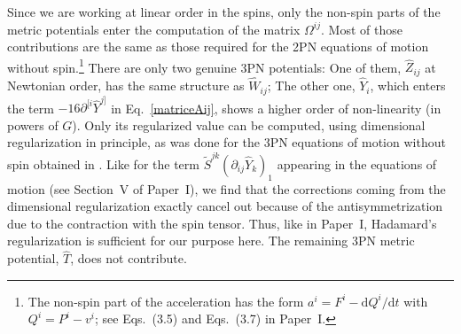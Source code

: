 \documentclass[
superscriptaddress,
preprint,
prd,tightenlines,showpacs,nofootinbib,
eqsecnum,
amsfonts,amsmath,amssymb]{revtex4-1}
\newcommand{\ud}{\mathrm{d}}
\begin{document}
Since we are working at linear order in the spins, only the non-spin
parts of the metric potentials enter the computation of the matrix
$\Omega^{ij}$. Most of those contributions are the same as those
required for the 2PN equations of motion without spin.\footnote{The
  non-spin part of the acceleration has the form $a^{i} = F^{i} - \ud
  Q^{i}/\ud t $ with $Q^i = P^i - v^i$; see Eqs.~(3.5) and Eqs.~(3.7)
  in Paper~I.} There are only two genuine 3PN potentials: One of them,
$\hat{Z}_{ij}$ at Newtonian order, has the same structure as
$\hat{W}_{ij}$; The other one, $\hat{Y}_i$, which enters the term
$-16 \partial^{[i}\hat{Y}^{j]}$ in Eq.~\eqref{matriceAij}, shows a
higher order of non-linearity (in powers of $G$). Only its regularized
value can be computed, using dimensional regularization in principle,
as was done for the 3PN equations of motion without spin obtained in
\cite{Blanchet2004}. Like for the term
$\tilde{S}^{jk}(\partial_{ij}\hat{Y}_{k})_{1}$ appearing in the
equations of motion (see Section~V of Paper~I), we find that the
corrections coming from the dimensional regularization exactly cancel
out because of the antisymmetrization due to the contraction with the
spin tensor. Thus, like in Paper~I, Hadamard's regularization is
sufficient for our purpose here. The remaining 3PN metric potential,
$\hat{T}$, does not contribute.
\end{document}
